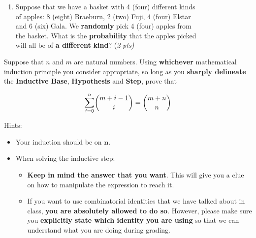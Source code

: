 \documentclass[letterpaper,10pt]{article}
\begin{document}
{{\begin{enumerate}[label=(\alph*)]
\begin{enumerate}[label=(\roman*)]
		\begin{enumerate}[label=(\roman*)] \setlength\itemsep{1.5em} 
			\item It must have \emph{the same} number of men and women? \null\hfill \myline{1in} {(\em 1 pt)}
			\item \doublespacing It must have \emph{more} women than men?  Please note that \\ $\mathbf 0$ \textbf{(zero)} men and a  \textbf{non-zero} number of women \textbf{still} \\ means that there are \textbf{more women than men} in the \\ committee!   \null\hfill \myline{1in}  {\em (2 pts)}
		\end{enumerate}		
	\item  \doublespacing Suppose that we have a basket with 4 (four) different kinds \\  of apples: 8 (eight) Braeburn, 2 (two) Fuji, 4 (four) Elstar \\ and 6 (six) Gala. We {\bf randomly} pick 4 (four) apples from \\ the basket. What is the {\bf probability} that the apples picked \\ will all be of  \textbf{a different} \textbf{kind}? \null\hfill \myline{1in}  {(\em 2 pts)}
\end{enumerate} 
		\end{enumerate}
 \vspace{-.5in}
 
 \pagebreak


{\large Suppose that $n$ and $m$ are natural numbers. Using {\bf whichever} mathematical induction principle you consider appropriate, so long as you {\bf sharply delineate} the {\bf Inductive Base}, {\bf Hypothesis} and {\bf Step}, prove that  }

{\Large $$\Sum_{i=0}^{n}  \binom{m + i - 1}{i} = \binom{m + n}{n}$$ } 

{\large 
Hints: 
\begin{itemize} 
	\item Your induction should be on $\mathbf n$.
	\item When solving the inductive step:
	\begin{itemize}
		\item  \textbf{Keep in mind the answer that you want}.  This will give you a clue on how to manipulate the expression to reach it.
		\item If you want to use combinatorial identities that we have talked about in class, \textbf{you are absolutely allowed to do so}. However, please make sure you \textbf{explicitly state  which identity you are using} so that we can understand what you are doing during grading.
\end{itemize}	
	

\end{itemize}}}}
\end{document}
